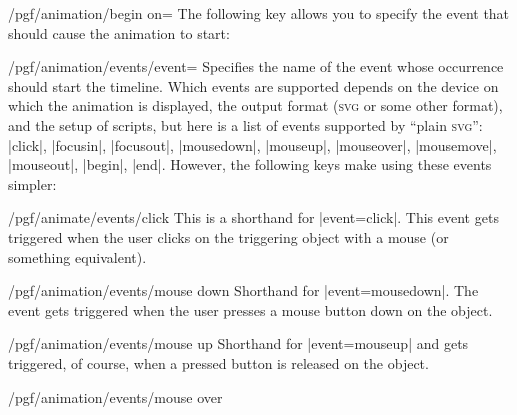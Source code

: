 \begin{key}{/pgf/animation/begin on=}
  The following key allows you to specify the event that should cause
  the animation to start:
  \begin{key}{/pgf/animation/events/event=}
    Specifies the name of the event whose occurrence should start the
    timeline. Which events are supported depends on the device on
    which the animation is displayed, the output format
    (\textsc{svg} or some other format), and the setup of scripts, but
    here is a list of events supported by ``plain \textsc{svg}'':
    |click|, |focusin|, |focusout|, |mousedown|,  |mouseup|,
    |mouseover|, |mousemove|, |mouseout|, |begin|, |end|. However, the
    following keys make using these events simpler:
    \begin{key}{/pgf/animate/events/click}
      This is a shorthand for |event=click|. This event gets triggered
      when the user clicks on the triggering object with a mouse (or
      something equivalent).
\begin{codeexample}[width=2cm]
\end{codeexample}
    \end{key}
    \begin{key}{/pgf/animation/events/mouse down}
      Shorthand for |event=mousedown|. The event gets
      triggered when the user presses a mouse button down on the object.
\begin{codeexample}[width=2cm]
\end{codeexample}
    \end{key}
    \begin{key}{/pgf/animation/events/mouse up}
      Shorthand for |event=mouseup| and gets triggered, of course,
      when a pressed button is released on the object.
\begin{codeexample}[width=2cm]
\end{codeexample}
    \end{key}
    \begin{key}{/pgf/animation/events/mouse over}

\end{key}
\end{key}
\end{key}
